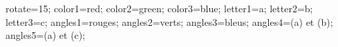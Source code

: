 \documentclass[exercice]{thedocument}%
\begin{document}
%
\>rotate=15;%
\>color1=red;%
\>color2=green;%
\>color3=blue;%
\>letter1=a;%
\>letter2=b;%
\>letter3=c;%
\>angles1=rouges;%
\>angles2=verts;%
\>angles3=bleus;%
\>angles4=(a) et (b);%
\>angles5=(a) et (c);%
%
\end{document}
